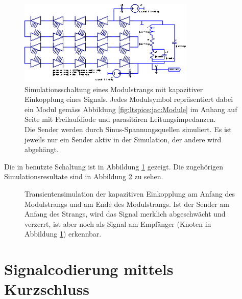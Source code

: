 \begin{figure}[h!tb]
    \centering
    \includegraphics[width=0.75\textwidth]{images/ltspice/jac/capacitive.eps}
    \caption[-Schaltung kapazitive Einkopplung, Modulstrang]{%
        Simulationsschaltung  eines Modulstrangs  mit kapazitiver  Einkopplung
        eines  Signals. Jedes   Modulsymbol  repr\"asentiert dabei  ein  Modul
        gem\"ass  Abbildung \ref{fig:ltspice:jac:Module}  im Anhang  auf Seite
        \pageref{fig:ltspice:jac:Module}  mit Freilaufdiode  und parasit\"aren
        Leitungsimpedanzen.\protect\\
        Die  Sender  werden  durch  Sinus-Spannungsquellen  simuliert. Es  ist
        jeweils  nur ein  Sender  aktiv  in der  Simulation,  der andere  wird
        abgeh\"angt.%
    }
    \label{fig:ltspice:capacitive:string}
\end{figure}

Die    in        benutzte    Schaltung    ist    in    Abbildung
\ref{fig:ltspice:capacitive:string}      gezeigt.       Die      zugeh\"origen
Simulationsresultate   sind    in   Abbildung   \ref{fig:simu:capacitive:tran}
zu sehen.%

\begin{figure}[h!tb]
    
    \caption[Simulationsergebnisse kapazitive Einkopplung, Modulstrang]{%
        Transientensimulation  der  kapazitiven   Einkopplung  am  Anfang  des
        Modulstrangs und  am Ende des  Modulstrangs. Ist der Sender  am Anfang
        des Strangs, wird das Signal merklich abgeschw\"acht und verzerrt, ist
        aber  noch  als  Signal  am  Empf\"anger  (Knoten    in
        Abbildung \ref{fig:ltspice:capacitive:string}) erkennbar.%
    }
    \label{fig:simu:capacitive:tran}
\end{figure}


\clearpage
\section{Signalcodierung mittels Kurzschluss}
\label{sec:simu:short}

